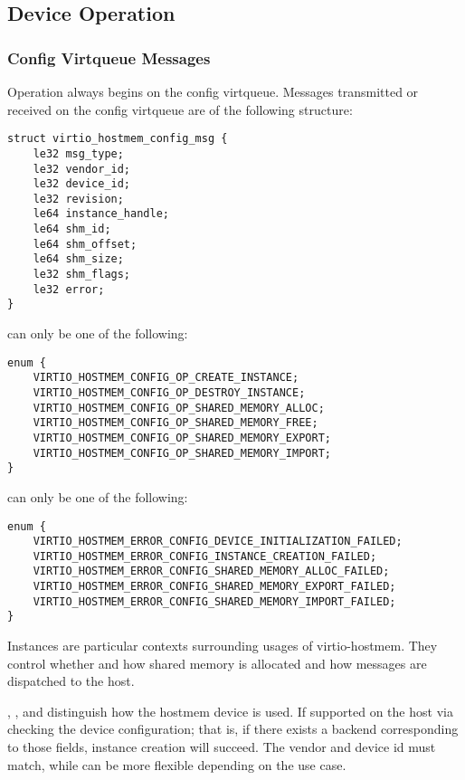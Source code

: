 \subsection{Device Operation}\label{sec:Device Types / Host Memory Device / Device Operation}

\subsubsection{Config Virtqueue Messages}\label{sec:Device Types / Host Memory Device / Device Operation / Config Virtqueue Messages}

Operation always begins on the config virtqueue.
Messages transmitted or received on the config virtqueue are of the following structure:

\begin{lstlisting}
struct virtio_hostmem_config_msg {
    le32 msg_type;
    le32 vendor_id;
    le32 device_id;
    le32 revision;
    le64 instance_handle;
    le64 shm_id;
    le64 shm_offset;
    le64 shm_size;
    le32 shm_flags;
    le32 error;
}
\end{lstlisting}

 can only be one of the following:

\begin{lstlisting}
enum {
    VIRTIO_HOSTMEM_CONFIG_OP_CREATE_INSTANCE;
    VIRTIO_HOSTMEM_CONFIG_OP_DESTROY_INSTANCE;
    VIRTIO_HOSTMEM_CONFIG_OP_SHARED_MEMORY_ALLOC;
    VIRTIO_HOSTMEM_CONFIG_OP_SHARED_MEMORY_FREE;
    VIRTIO_HOSTMEM_CONFIG_OP_SHARED_MEMORY_EXPORT;
    VIRTIO_HOSTMEM_CONFIG_OP_SHARED_MEMORY_IMPORT;
}
\end{lstlisting}

 can only be one of the following:

\begin{lstlisting}
enum {
    VIRTIO_HOSTMEM_ERROR_CONFIG_DEVICE_INITIALIZATION_FAILED;
    VIRTIO_HOSTMEM_ERROR_CONFIG_INSTANCE_CREATION_FAILED;
    VIRTIO_HOSTMEM_ERROR_CONFIG_SHARED_MEMORY_ALLOC_FAILED;
    VIRTIO_HOSTMEM_ERROR_CONFIG_SHARED_MEMORY_EXPORT_FAILED;
    VIRTIO_HOSTMEM_ERROR_CONFIG_SHARED_MEMORY_IMPORT_FAILED;
}
\end{lstlisting}

Instances are particular contexts surrounding usages of virtio-hostmem.
They control whether and how shared memory is allocated
and how messages are dispatched to the host.

, , and 
distinguish how the hostmem device is used.
If supported on the host via checking the device configuration;
that is, if there exists a backend corresponding to those fields,
instance creation will succeed.
The vendor and device id must match,
while  can be more flexible depending on the use case.


